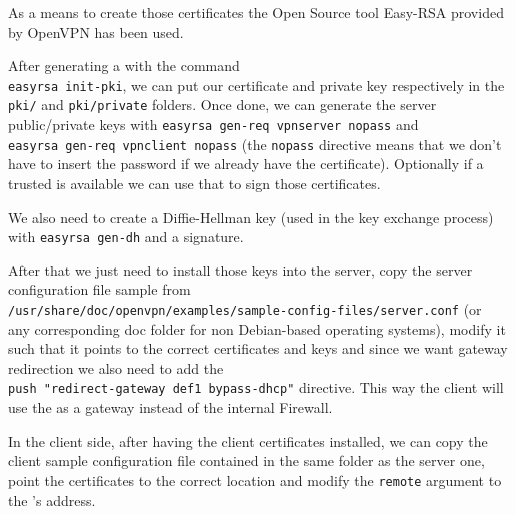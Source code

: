 As a means to create those certificates the Open Source tool Easy-RSA\cite{easyrsa} provided by OpenVPN has been used.

After generating a  with the command \\
\verb|easyrsa init-pki|, we can put our  certificate and private key respectively in the \verb|pki/| and \verb|pki/private| folders. Once done, we can generate the server public/private keys with \verb|easyrsa gen-req vpnserver nopass|  and \\
\verb|easyrsa gen-req vpnclient nopass| (the \verb|nopass| directive means that we don't have to insert the password if we already have the certificate). Optionally if a trusted  is available we can use that to sign those certificates.

We also need to create a Diffie-Hellman\cite{diffie-hellman} key (used in the key exchange process) with \verb|easyrsa gen-dh| and a \cite{hmac} signature\cite{vultr}.

After that we just need to install those keys into the server, copy the server configuration file sample from \\
\verb|/usr/share/doc/openvpn/examples/sample-config-files/server.conf| (or\\ any corresponding doc folder for non Debian-based operating systems), modify it such that it points to the correct certificates and keys and since we want gateway redirection we also need to add the \\ \verb|push "redirect-gateway def1 bypass-dhcp"| directive. This way the client will use the  as a gateway instead of the internal Firewall.

In the client side, after having the client certificates installed, we can copy the client sample configuration file contained in the same folder as the server one, point the certificates to the correct location and modify the \verb|remote| argument to the 's  address.

\newpage


